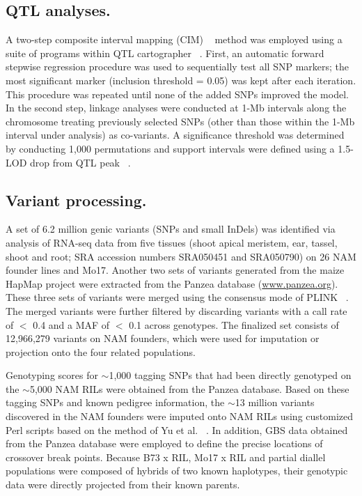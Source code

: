 \documentclass[10pt,letterpaper]{article}
\begin{document}
\subsection*{QTL analyses.}
A two-step composite interval mapping (CIM) ~\cite{Zeng1993} method was employed using a suite of programs within QTL cartographer ~\cite{DaCostaE.Silva2012}. First, an automatic forward stepwise regression procedure was used to sequentially test all SNP markers; the most significant marker (inclusion threshold = 0.05) was kept after each iteration. This procedure was repeated until none of the added SNPs improved the model. In the second step, linkage analyses were conducted at 1-Mb intervals along the chromosome treating previously selected SNPs (other than those within the 1-Mb interval under analysis) as co-variants. A significance threshold was determined by conducting 1,000 permutations and support intervals were defined using a 1.5-LOD drop from QTL peak ~\cite{Lander1989}.

\subsection*{Variant processing.}
A set of 6.2 million genic variants (SNPs and small InDels) was identified via analysis of RNA-seq data from five tissues (shoot apical meristem, ear, tassel, shoot and root; SRA accession numbers SRA050451 and SRA050790) on 26 NAM founder lines and Mo17. Another two sets of variants generated from the maize HapMap project were extracted from the Panzea database (\url{www.panzea.org}). These three sets of variants were merged using the consensus mode of PLINK ~\cite{Purcell2007}. The merged variants were further filtered by discarding variants with a call rate of $<$ 0.4 and a MAF of $<$ 0.1 across genotypes. The finalized set consists of 12,966,279 variants on NAM founders, which were used for imputation or projection onto the four related populations.

Genotyping scores for $\sim$1,000 tagging SNPs that had been directly genotyped on the $\sim$5,000 NAM RILs were obtained from the Panzea database. Based on these tagging SNPs and known pedigree information, the $\sim$13 million variants discovered in the NAM founders were imputed onto NAM RILs using customized Perl scripts based on the method of Yu et al. ~\cite{Yu2008}. In addition, GBS data obtained from the Panzea database were employed to define the precise locations of crossover break points. Because B73 x RIL, Mo17 x RIL and partial diallel populations were composed of hybrids of two known haplotypes, their genotypic data were directly projected from their known parents. 
\end{document}
